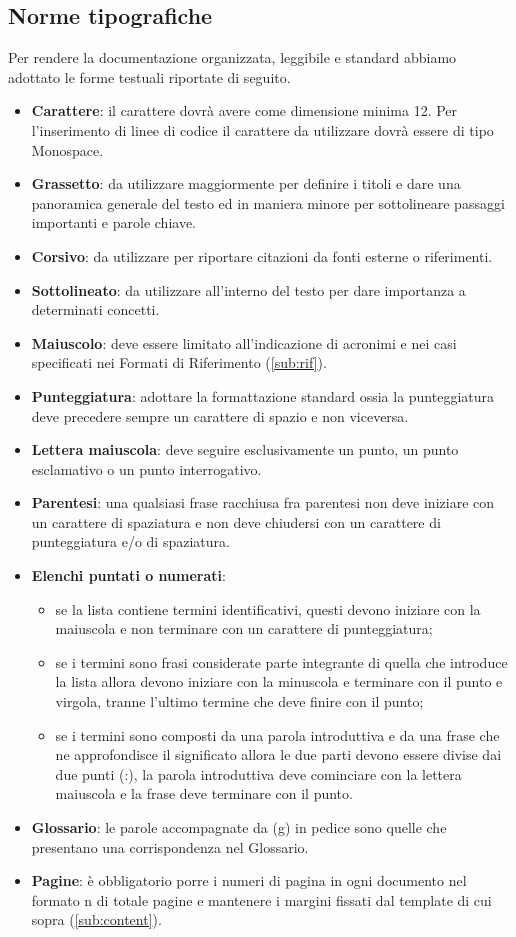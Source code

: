 {		\subsection{Norme tipografiche}{
			\label{sub:typo}
			Per rendere la documentazione organizzata, leggibile e standard abbiamo adottato le forme testuali riportate di seguito.
			\begin{itemize}
				\item \textbf{Carattere}: il carattere dovr\`{a} avere come dimensione minima 12. Per l'inserimento di linee di codice il carattere da utilizzare dovr\`{a} essere di tipo Monospace.
				\item \textbf{Grassetto}: da utilizzare maggiormente per definire i titoli e dare una panoramica generale del testo ed in maniera minore per sottolineare passaggi importanti e parole chiave.
				\item \textbf{Corsivo}: da utilizzare per riportare citazioni da fonti esterne o riferimenti.
				\item \textbf{Sottolineato}: da utilizzare all'interno del testo per dare importanza a determinati concetti.
				\item \textbf{Maiuscolo}: deve essere limitato all’indicazione di acronimi e nei casi specificati nei Formati di Riferimento (\ref{sub:rif}).
				\item \textbf{Punteggiatura}: adottare la formattazione standard ossia la punteggiatura deve precedere sempre un carattere di spazio e non viceversa.
				\item \textbf{Lettera maiuscola}: deve seguire esclusivamente un punto, un punto esclamativo o un punto interrogativo.
				\item \textbf{Parentesi}: una qualsiasi frase racchiusa fra parentesi non deve iniziare con un carattere di spaziatura e non deve chiudersi con un carattere di punteggiatura e/o di spaziatura.
				\item \textbf{Elenchi puntati o numerati}:
					\begin{itemize}
						\item se la lista contiene termini identificativi, questi devono iniziare con la maiuscola e non terminare con un carattere di punteggiatura;
						\item se i termini sono frasi considerate parte integrante di quella che introduce la lista allora devono iniziare con la minuscola e terminare con il punto e virgola, tranne l’ultimo termine che deve finire con il punto;
						\item se i termini sono composti da una parola introduttiva e da una frase che ne approfondisce il significato allora le due parti devono essere divise dai due punti (:), la parola introduttiva deve cominciare con la lettera maiuscola e la frase deve terminare con il punto.
					\end{itemize}
				\item \textbf{Glossario}: le parole accompagnate da (g) in pedice sono quelle che presentano una corrispondenza nel Glossario.
				\item \textbf{Pagine}: \`{e} obbligatorio porre i numeri di pagina in ogni documento nel formato {n} di {totale pagine} e mantenere i margini fissati dal template di cui sopra (\ref{sub:content}).
			\end{itemize}
		}
}
